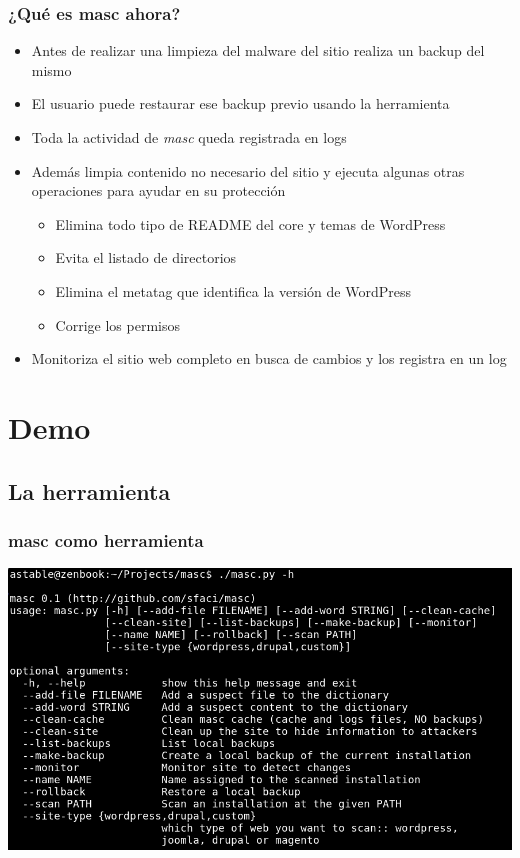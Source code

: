 \documentclass[xcolor={dvipsnames}]{beamer}
\begin{document}
\begin{frame}\frametitle{¿Qué es masc ahora?}
    \begin{itemize}
        \item Antes de realizar una limpieza del malware del sitio realiza un backup del mismo
        \item El usuario puede restaurar ese backup previo usando la herramienta
        \item Toda la actividad de \emph{masc} queda registrada en logs
        \item Además limpia contenido no necesario del sitio y ejecuta algunas otras operaciones para ayudar en su protección
            \begin{itemize}
                \item Elimina todo tipo de README del core y temas de WordPress
                \item Evita el listado de directorios
                \item Elimina el metatag que identifica la versión de WordPress
                \item Corrige los permisos
            \end{itemize}
        \item Monitoriza el sitio web completo en busca de cambios y los registra en un log
    \end{itemize}
\end{frame}

\section{Demo}
\subsection{La herramienta}
\begin{frame}\frametitle{masc como herramienta}
    \includegraphics[scale=0.35]{options} 
\end{frame}
\end{document}
